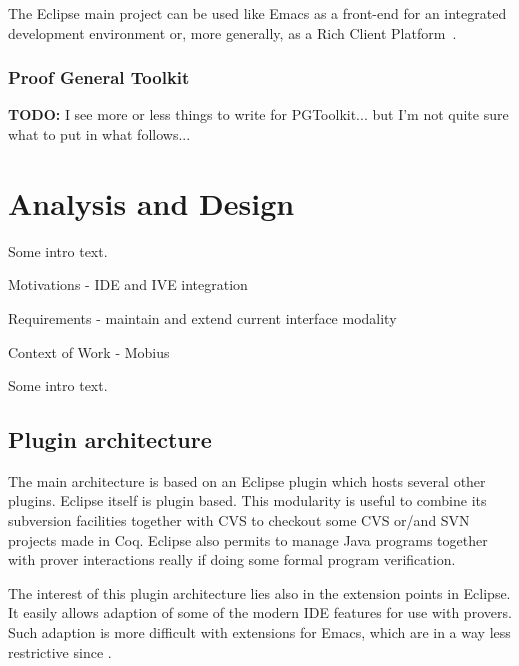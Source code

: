 \documentclass{llncs}
\newcommand{\todo}{\textbf{TODO: }}
\begin{document}
The Eclipse main project can be used like Emacs as a front-end for an
integrated development environment or, more generally, as a Rich
Client Platform~\cite{eclipse-rcp}.

\subsubsection{Proof General Toolkit}
\label{subsubsec:proof-gener-toolk}

\todo{I see more or less things to write for PGToolkit... but I'm not quite
sure what to put in what follows...}\\

\section{Analysis and Design}
\label{sec:design}

Some intro text.

Motivations - IDE and IVE integration

Requirements - maintain and extend current interface modality %

Context of Work - Mobius %

Some intro text. %

\subsection{Plugin architecture}
\label{subsec:plugin-architecture}

The main architecture is based on an Eclipse plugin which hosts
several other plugins.  Eclipse itself is plugin based.  This
modularity is useful to combine its subversion facilities together
with CVS to checkout some CVS or/and SVN projects made in Coq.
Eclipse also permits to manage Java programs together with prover
interactions really if doing some formal program verification.

The interest of this plugin architecture lies also in the extension
points in Eclipse.  It easily allows adaption of some of the modern
IDE features for use with provers.  Such adaption is more difficult
with extensions for Emacs, which are in a way less restrictive since .

\end{document}
